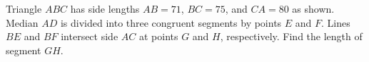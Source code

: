 Triangle ${ABC}$ has side lengths ${AB}=71$, ${BC}=75$, and ${CA}=80$ as shown. Median $AD$ is divided into three congruent segments by points $E$ and $F$. Lines ${BE}$ and ${BF}$ intersect side ${AC}$ at points $G$ and $H$, respectively. Find the length of segment ${GH}$.
